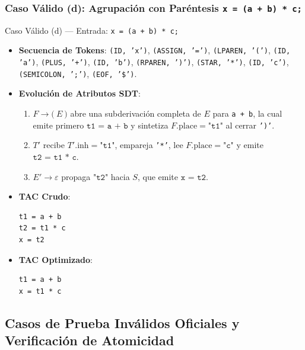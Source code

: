 \documentclass[11pt, letterpaper]{article}
\begin{document}
\subsubsection{Caso Válido (d): Agrupación con Paréntesis \texttt{x = (a + b) * c;}}
\begin{tracebox}{Caso Válido (d) --- Entrada: \texttt{x = (a + b) * c;}}
\begin{itemize}[leftmargin=1.5em, itemsep=2pt]
    \item \textbf{Secuencia de Tokens}: \texttt{(ID, 'x')}, \texttt{(ASSIGN, '=')}, \texttt{(LPAREN, '(')}, \texttt{(ID, 'a')}, \texttt{(PLUS, '+')}, \texttt{(ID, 'b')}, \texttt{(RPAREN, ')')}, \texttt{(STAR, '*')}, \texttt{(ID, 'c')}, \texttt{(SEMICOLON, ';')}, \texttt{(EOF, '\$')}.
    \item \textbf{Evolución de Atributos SDT}:
    \begin{enumerate}[leftmargin=1.5em]
        \item $F \rightarrow \textbf{(}\ E\ \textbf{)}$ abre una subderivación completa de $E$ para \texttt{a + b}, la cual emite primero $\texttt{t1 = a + b}$ y sintetiza $F.\text{place} = \texttt{"t1"}$ al cerrar \texttt{')'}.
        \item $T'$ recibe $T'.\text{inh} = \texttt{"t1"}$, empareja \texttt{'*'}, lee $F.\text{place} = \texttt{"c"}$ y emite $\texttt{t2 = t1 * c}$.
        \item $E' \rightarrow \varepsilon$ propaga $\texttt{"t2"}$ hacia $S$, que emite $\texttt{x = t2}$.
    \end{enumerate}
    \item \textbf{TAC Crudo}:
    \begin{lstlisting}[numbers=none]
t1 = a + b
t2 = t1 * c
x = t2
    \end{lstlisting}
    \item \textbf{TAC Optimizado}:
    \begin{lstlisting}[numbers=none]
t1 = a + b
x = t1 * c
    \end{lstlisting}
\end{itemize}
\end{tracebox}

\subsection{Casos de Prueba Inválidos Oficiales y Verificación de Atomicidad}

\end{document}
